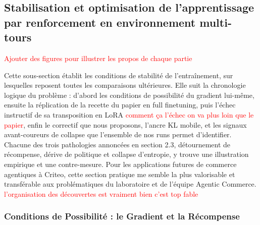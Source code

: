 \documentclass[11pt,a4paper]{article}
\begin{document}
\subsection{Stabilisation et optimisation de l'apprentissage par renforcement en environnement multi-tours}



\textcolor{red}{Ajouter des figures pour illustrer les propos de chaque partie} 

Cette sous-section établit les conditions de stabilité de l'entraînement, sur lesquelles reposent toutes les comparaisons ultérieures. Elle suit la chronologie logique du problème : d'abord les conditions de possibilité du gradient lui-même, ensuite la réplication de la recette du papier en full finetuning, puis l'échec instructif de sa transposition en LoRA \textcolor{red}{comment ça l'échec on va plus loin que le papier}, enfin le correctif que nous proposons, l'ancre KL mobile, et les signaux avant-coureurs de collapse que l'ensemble de nos runs permet d'identifier. Chacune des trois pathologies annoncées en section 2.3, détournement de récompense, dérive de politique et collapse d'entropie, y trouve une illustration empirique et une contre-mesure. Pour les applications futures de commerce agentiques à Criteo, cette section pratique me semble la plus valorisable et transférable aux problématiques du laboratoire et de l'équipe Agentic Commerce. \textcolor{red}{l'organisation des découvertes est vraiment bien c'est top fable}

\subsubsection{Conditions de Possibilité : le Gradient et la Récompense}
\end{document}
